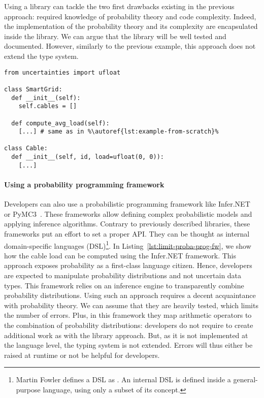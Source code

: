 Using a library can tackle the two first drawbacks existing in the previous approach: required knowledge of probability theory and code complexity.
Indeed, the implementation of the probability theory and its complexity are encapsulated inside the library.
We can argue that the library will be well tested and documented.
However, similarly to the previous example, this approach does not extend the type system.

\begin{lstlisting}[style=pythonStyle, caption=Managing uncertainty in Python using uncertainties~\cite{url:uncertainties}, label=lst:example-python-uncertainties, linewidth=0.97\textwidth, escapechar=\%]
from uncertainties import ufloat

class SmartGrid:
  def __init__(self):
    self.cables = []

  def compute_avg_load(self):
    [...] # same as in %\autoref{lst:example-from-scratch}%

class Cable:
  def __init__(self, id, load=ufloat(0, 0)):
    [...]
\end{lstlisting}

\paragraph{Using a probability programming framework}
Developers can also use a probabilistic programming framework like Infer.NET~\cite{url:InferNET18} or PyMC3~\cite{DBLP:journals/peerj-cs/SalvatierWF16}.
These frameworks allow defining complex probabilistic models and applying inference algorithms.
Contrary to previously described libraries, these frameworks put an effort to set a proper API.
They can be thought as internal domain-specific languages (DSL)\cite{fowler2010domain}\footnote{Martin Fowler defines a DSL as \cite{fowler2010domain}. An internal DSL is defined inside a general-purpose language, using only a subset of its concept.}.
In Listing~\ref{lst:limit-proba-prog-fw}, we show how the cable load can be computed using the Infer.NET framework.
This approach exposes probability as a first-class language citizen. 
Hence, developers are expected to manipulate probability distributions and not uncertain data types. 
This framework relies on an inference engine to transparently combine probability distributions.
Using such an approach requires a decent acquaintance with probability theory.
We can assume that they are heavily tested, which limits the number of errors.
Plus, in this framework they map arithmetic operators to the combination of probability distributions: developers do not require to create additional work as with the library approach.
But, as it is not implemented at the language level, the typing system is not extended.
Errors will thus either be raised at runtime or not be helpful for developers.

